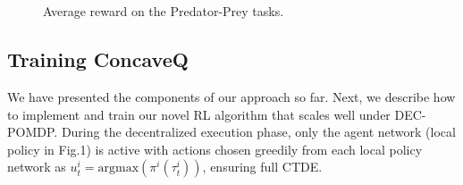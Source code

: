 {\begin{figure}[ht!]%
    \centering
    \\
    \\    
    \caption{Average reward on the Predator-Prey tasks.}
    \label{exp_stag_hunt}
\end{figure}

\subsection{Training ConcaveQ} 

We have presented the components of our approach so far. Next, we describe how to implement and train our novel RL algorithm that scales well under DEC-POMDP. During the decentralized execution phase, only the agent network (local policy in Fig.1) is active with actions chosen greedily from each local policy network as $u^i_t = \text{argmax} (\pi^i(\tau^i_t))$, ensuring full CTDE. 



}
